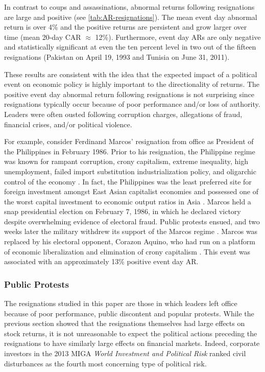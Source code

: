 \documentclass[12pt,final,fleqn]{article}
\theoremstyle{plain}
\begin{document}
In contrast to coups and assassinations, abnormal returns following resignations are large and positive (see \autoref{tab:AR-resignations}). The mean event day abnormal return is over 4\% and the positive returns are persistent and grow larger over time (mean 20-day CAR $\approx$ 12\%). Furthermore, event day ARs are only negative and statistically significant at even the ten percent level in two out of the fifteen resignations (Pakistan on April 19, 1993 and Tunisia on June 31, 2011).

These results are consistent with the idea that the expected impact of a political event on economic policy is highly important to the directionality of returns. The positive event day abnormal return following resignations is not surprising since resignations typically occur because of poor performance and/or loss of authority. Leaders were often ousted following corruption charges, allegations of fraud, financial crises, and/or political violence. 

For example, consider Ferdinand Marcos' resignation from office as President of the Philippines in February 1986. Prior to his resignation, the Philippine regime was known for rampant corruption, crony capitalism, extreme inequality, high unemployment, failed import substitution industrialization policy, and oligarchic control of the economy \citep{overholt1986rise, traywick2014}. In fact, the Philippines was the least preferred site for foreign investment amongst East Asian capitalist economies and possessed one of the worst capital investment to economic output ratios in Asia \citep{overholt1986rise}. Marcos held a snap presidential election on February 7, 1986, in which he declared victory despite overwhelming evidence of electoral fraud. Public protests ensued, and two weeks later the military withdrew its support of the Marcos regime \citep{lee2009armed}. Marcos was replaced by his electoral opponent, Corazon Aquino, who had run on a platform of economic liberalization and elimination of crony capitalism \citep{villegas1987philippines}. This event was associated with an approximately 13\% positive event day AR.

\subsubsection{Public Protests} \label{subsec: Public Protests}
The resignations studied in this paper are those in which leaders left office because of poor performance, public discontent and popular protests. While the previous section showed that the resignations themselves had large effects on stock returns, it is not unreasonable to expect the political actions preceding the resignations to have similarly large effects on financial markets. Indeed, corporate investors in the 2013 MIGA \textit{World Investment and Political Risk} ranked civil disturbances as the fourth most concerning type of political risk.
\end{document}
